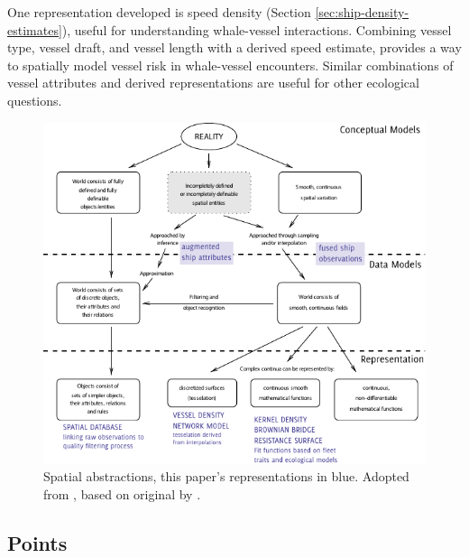 One representation developed is speed density (Section \ref{sec:ship-density-estimates}), useful for understanding whale-vessel interactions. Combining vessel type, vessel draft, and vessel length with a derived speed estimate, provides a way to spatially model vessel risk in whale-vessel encounters. Similar combinations of vessel attributes and derived representations are useful for other ecological questions.
\begin{figure}[h!]
  \centering
  \hspace*{-0.25in}
  \includegraphics[width=155mm]{figures/representation-in-gis-myriad.pdf}
  \caption[Spatial abstractions]{Spatial abstractions, this paper's {\color{DBlue} representations in blue}. Adopted from \cite{Bivand2011}, based on original by \cite{burrough1996geographic}.}
  \label{fig:representation-in-gis}
\end{figure}

\subsection{Points}

